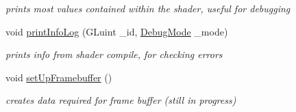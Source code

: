 \begin{DoxyCompactItemize}
\begin{DoxyCompactList}\small\item\em prints most values contained within the shader, useful for debugging \end{DoxyCompactList}\item 
\hypertarget{struct_shader_pro_a055b4e00dff7becc620096b74ada78f5}{void \hyperlink{struct_shader_pro_a055b4e00dff7becc620096b74ada78f5}{print\-Info\-Log} (G\-Luint \-\_\-id, \hyperlink{struct_shader_pro_a1dfb06c4b3b2d1651492a0a3c44ef555}{Debug\-Mode} \-\_\-mode)}\label{struct_shader_pro_a055b4e00dff7becc620096b74ada78f5}

\begin{DoxyCompactList}\small\item\em prints info from shader compile, for checking errors \end{DoxyCompactList}\item 
\hypertarget{struct_shader_pro_a0c4bf7215d8c134752b13a9a86842ba2}{void \hyperlink{struct_shader_pro_a0c4bf7215d8c134752b13a9a86842ba2}{set\-Up\-Framebuffer} ()}\label{struct_shader_pro_a0c4bf7215d8c134752b13a9a86842ba2}

\begin{DoxyCompactList}\small\item\em creates data required for frame buffer (still in progress) \end{DoxyCompactList}\end{DoxyCompactItemize}
